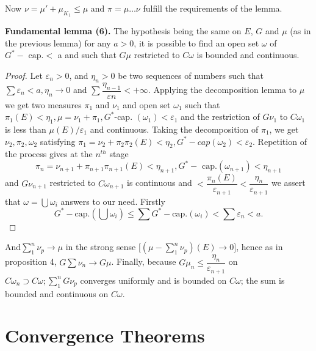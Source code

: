 Now $\nu = \mu' + \mu_{K_{1}} \leq \mu $ and $ \pi = \mu \dots \nu $
fulfill the requirements of the lemma. 

\noindent 
\textbf{Fundamental lemma (6).} %
The hypothesis being the  same on $E$, $G$ and $\mu$ (as in the
previous lemma)  for any $a > 0$, it is possible to find an open set
$\omega$ of $G^*-\text{ cap}. <$ a and such that $G \mu$ restricted to $C
\omega$ is  bounded and  continuous. 

\begin{proof}
  Let $\varepsilon_n > 0$, and $\eta_n > 0$ be two sequences  of
  numbers such that $ \sum \varepsilon_n <  a,  \eta_n \to 0 $ and $
  \sum \dfrac{\eta_{n-1}}{\varepsilon n} < + \infty$. Applying the
  decomposition lemma to $\mu$ we get two measures $ \pi_1 $ and
  $\nu_1$ and open set $\omega_1$ such that $\pi_1 (E) < \eta_1,  \mu
  = \nu_1 + \pi_1,  G^*$-cap. $ (\omega_1) < \varepsilon_1$ and the
  restriction of $G \nu_1$ to $ C \omega_1$  is less than $\mu (E) /
  \varepsilon_1$ and continuous. Taking the decomposition of $\pi_1 $,
  we get $\nu_2, \pi_2, \omega_2 $ satisfying  $ \pi_1 = \nu_2 + \pi_2
  \pi_2 (E) < \eta_2,  G^*-cap  (\omega_2 ) < \varepsilon_2
  $. Repetition of the process gives at the $ n^{th} $ stage 
  $$
  \pi_n =\nu_{n+1} + \pi_{n+1} \pi_{n+1} (E) < \eta_{n+1}, G^* -
  \text{ cap}. (\omega_{n+1} ) < \eta_{n+1} 
  $$
  and $G \nu_{n+1}$ restricted to $C \omega_{n+1} $ is continuous and
  $ < \dfrac{\pi_n (E)}{\varepsilon_{n+1}} <
  \dfrac{\eta_n}{\varepsilon_{n+1}}$ we assert that  $ \omega =
  \bigcup \omega_i $ answers to our need. Firstly 
  $$
  G^* - \text{cap}. \left( \bigcup \omega_i \right) \leq \sum G^*
  -\text{cap}. ( \omega_i ) < \sum \varepsilon_n < a.  
  $$
\end{proof}

And\pageoriginale $ \sum \limits^{n}_{1} \nu_p \to \mu $ in the strong sense $ \big[
  ( \mu - \sum \limits^{n}_{1} \nu_p ) (E) \to 0 \big ] $, hence as in
proposition 4, $ G \sum \nu_n \to G \mu $. Finally, because $ G \mu_n
\leq \dfrac{\eta_n}{\varepsilon_{n+1}} $ on  $ C \omega_n \supset C
\omega;  \sum \limits^{n}_{1} G \nu_p $ converges uniformly and is
bounded on $ C \omega $; the sum is bounded and continuous on $C
\omega$. 

\section{Convergence Theorems}\label{p3:chap5:sec14} %

